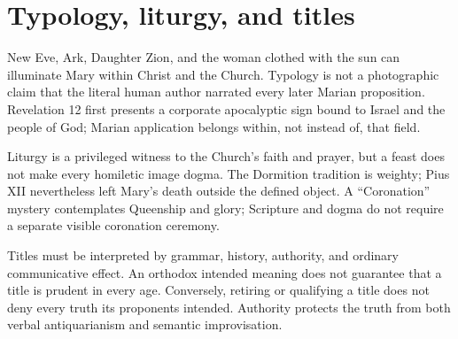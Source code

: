 \section{Typology, liturgy, and titles}

New Eve, Ark, Daughter Zion, and the woman clothed with the sun can illuminate
Mary within Christ and the Church. Typology is not a photographic claim that
the literal human author narrated every later Marian proposition. Revelation
12 first presents a corporate apocalyptic sign bound to Israel and the people
of God; Marian application belongs within, not instead of, that field.

Liturgy is a privileged witness to the Church's faith and prayer, but a feast
does not make every homiletic image dogma. The Dormition tradition is weighty;
Pius XII nevertheless left Mary's death outside the defined object. A
``Coronation'' mystery contemplates Queenship and glory; Scripture and dogma do
not require a separate visible coronation ceremony.

Titles must be interpreted by grammar, history, authority, and ordinary
communicative effect. An orthodox intended meaning does not guarantee that a
title is prudent in every age. Conversely, retiring or qualifying a title does
not deny every truth its proponents intended. Authority protects the truth
from both verbal antiquarianism and semantic improvisation.


